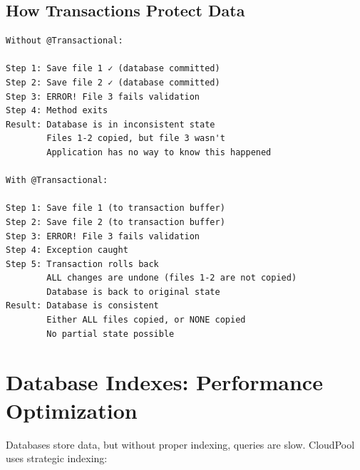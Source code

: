 \documentclass[11pt,a4paper]{report}
\begin{document}
\section{How Transactions Protect Data}


\begin{lstlisting}[language=text]
Without @Transactional:

Step 1: Save file 1 ✓ (database committed)
Step 2: Save file 2 ✓ (database committed)
Step 3: ERROR! File 3 fails validation
Step 4: Method exits
Result: Database is in inconsistent state
        Files 1-2 copied, but file 3 wasn't
        Application has no way to know this happened

With @Transactional:

Step 1: Save file 1 (to transaction buffer)
Step 2: Save file 2 (to transaction buffer)
Step 3: ERROR! File 3 fails validation
Step 4: Exception caught
Step 5: Transaction rolls back
        ALL changes are undone (files 1-2 are not copied)
        Database is back to original state
Result: Database is consistent
        Either ALL files copied, or NONE copied
        No partial state possible
\end{lstlisting}


\chapter{Database Indexes: Performance Optimization}


Databases store data, but without proper indexing, queries are slow. CloudPool uses strategic indexing:
\end{document}
